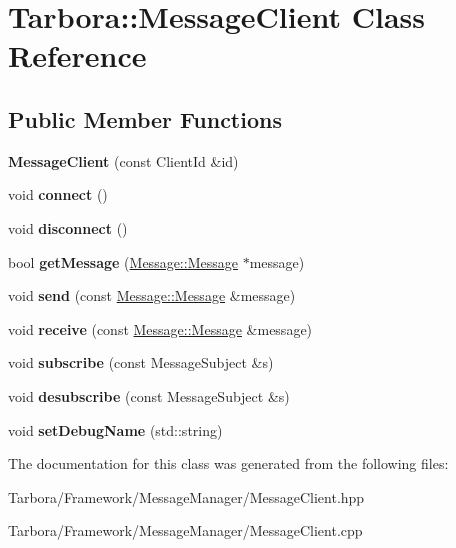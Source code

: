 \hypertarget{classTarbora_1_1MessageClient}{}\section{Tarbora\+:\+:Message\+Client Class Reference}
\label{classTarbora_1_1MessageClient}
\subsection*{Public Member Functions}
\begin{DoxyCompactItemize}
\item 
\mbox{\label{classTarbora_1_1MessageClient_a7bd80a6ee4ea1ba03052b4a2804d4ef5}} 
{\bfseries Message\+Client} (const Client\+Id \&id)
\item 
\mbox{\label{classTarbora_1_1MessageClient_a89b17761f726fb42d3efbb36bbbf9498}} 
void {\bfseries connect} ()
\item 
\mbox{\label{classTarbora_1_1MessageClient_acf6e8e3acb25ffb5b93fee46e7be1274}} 
void {\bfseries disconnect} ()
\item 
\mbox{\label{classTarbora_1_1MessageClient_ae7e2c3b8eafd7120a982874e063b28a1}} 
bool {\bfseries get\+Message} (\hyperlink{classTarbora_1_1Message_1_1Message}{Message\+::\+Message} $\ast$message)
\item 
\mbox{\label{classTarbora_1_1MessageClient_a4b33031bc1d16ccb22109e92c0795424}} 
void {\bfseries send} (const \hyperlink{classTarbora_1_1Message_1_1Message}{Message\+::\+Message} \&message)
\item 
\mbox{\label{classTarbora_1_1MessageClient_a701a47885bf3deadd9a8437e353e53f9}} 
void {\bfseries receive} (const \hyperlink{classTarbora_1_1Message_1_1Message}{Message\+::\+Message} \&message)
\item 
\mbox{\label{classTarbora_1_1MessageClient_ae0d0b75ce74ba317ff07aca007e9b48b}} 
void {\bfseries subscribe} (const Message\+Subject \&s)
\item 
\mbox{\label{classTarbora_1_1MessageClient_acd172722445ec4a80f6fdffe903eb983}} 
void {\bfseries desubscribe} (const Message\+Subject \&s)
\item 
\mbox{\label{classTarbora_1_1MessageClient_acf5431afba593f4f40516edc803a2244}} 
void {\bfseries set\+Debug\+Name} (std\+::string)
\end{DoxyCompactItemize}


The documentation for this class was generated from the following files\+:\begin{DoxyCompactItemize}
\item 
Tarbora/\+Framework/\+Message\+Manager/Message\+Client.\+hpp\item 
Tarbora/\+Framework/\+Message\+Manager/Message\+Client.\+cpp\end{DoxyCompactItemize}
